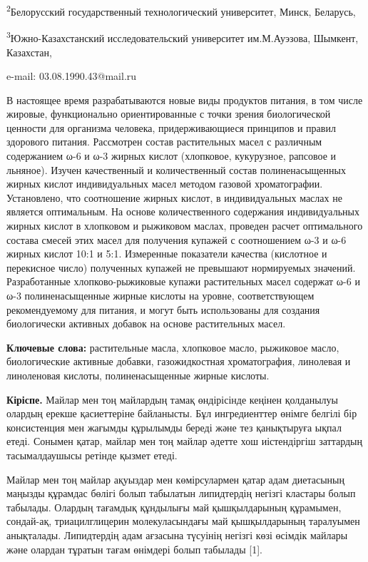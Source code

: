 \textsuperscript{2}Белорусский государственный технологический
университет, Минск, Беларусь,

\textsuperscript{3}Южно-Казахстанский исследовательский университет
им.М.Ауэзова, Шымкент, Казахстан,

e-mail: 03.08.1990.43@mail.ru

В настоящее время разрабатываются новые виды продуктов питания, в том
числе жировые, функционально ориентированные с точки зрения
биологической ценности для организма человека, придерживающиеся
принципов и правил здорового питания. Рассмотрен состав растительных
масел с различным содержанием ω-6 и ω-3 жирных кислот (хлопковое,
кукурузное, рапсовое и льняное). Изучен качественный и количественный
состав полиненасыщенных жирных кислот индивидуальных масел методом
газовой хроматографии. Установлено, что соотношение жирных кислот, в
индивидуальных маслах не является оптимальным. На основе количественного
содержания индивидуальных жирных кислот в хлопковом и рыжиковом маслах,
проведен расчет оптимального состава смесей этих масел для получения
купажей с соотношением ω-3 и ω-6 жирных кислот 10:1 и 5:1. Измеренные
показатели качества (кислотное и перекисное число) полученных купажей не
превышают нормируемых значений. Разработанные хлопково-рыжиковые купажи
растительных масел содержат ω-6 и ω-3 полиненасыщенные жирные кислоты на
уровне, соответствующем рекомендуемому для питания, и могут быть
использованы для создания биологически активных добавок на основе
растительных масел.

{\bfseries Ключевые слова:} растительные масла, хлопковое масло, рыжиковое
масло, биологические активные добавки, газожидкостная хроматография,
линолевая и линоленовая кислоты, полиненасыщенные жирные кислоты.

{\bfseries Кіріспе.} Майлар мен тоң майлардың тамақ өндірісінде кеңінен
қолданылуы олардың ерекше қасиеттеріне байланысты. Бұл ингредиенттер
өнімге белгілі бір консистенция мен жағымды құрылымды береді және тез
қанықтыруға ықпал етеді. Сонымен қатар, майлар мен тоң майлар әдетте хош
иістендіргіш заттардың тасымалдаушысы ретінде қызмет етеді.

Майлар мен тоң майлар ақуыздар мен көмірсулармен қатар адам диетасының
маңызды құрамдас бөлігі болып табылатын липидтердің негізгі кластары
болып табылады. Олардың тағамдық құндылығы май қышқылдарының құрамымен,
сондай-ақ, триацилглицерин молекуласындағы май қышқылдарының таралуымен
анықталады. Липидтердің адам ағзасына түсуінің негізгі көзі өсімдік
майлары және олардан тұратын тағам өнімдері болып табылады {[}1{]}.

